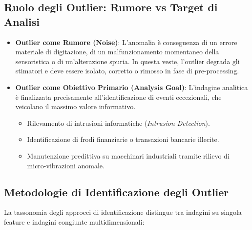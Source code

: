 \subsection{Ruolo degli Outlier: Rumore vs Target di Analisi}
\begin{itemize}
    \item \textbf{Outlier come Rumore (Noise)}: L'anomalia è conseguenza di un errore materiale di digitazione, di un malfunzionamento momentaneo della sensoristica o di un'alterazione spuria. In questa veste, l'outlier degrada gli stimatori e deve essere isolato, corretto o rimosso in fase di pre-processing.
    \item \textbf{Outlier come Obiettivo Primario (Analysis Goal)}: L'indagine analitica è finalizzata precisamente all'identificazione di eventi eccezionali, che veicolano il massimo valore informativo.
    \begin{itemize}[noitemsep]
        \item Rilevamento di intrusioni informatiche (\textit{Intrusion Detection}).
        \item Identificazione di frodi finanziarie o transazioni bancarie illecite.
        \item Manutenzione predittiva su macchinari industriali tramite rilievo di micro-vibrazioni anomale.
    \end{itemize}
\end{itemize}

\FloatBarrier
\subsection{Metodologie di Identificazione degli Outlier}

La tassonomia degli approcci di identificazione distingue tra indagini su singola feature e indagini congiunte multidimensionali:

